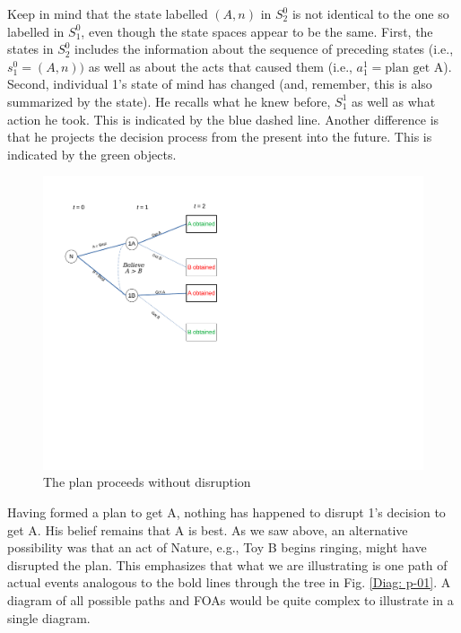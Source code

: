 \documentclass[
11pt,
titlepage,
reqno,
]{article}%
\theoremstyle{definition}
\begin{document}
Keep in mind that the state labelled $(A,n)$ in $S^0_2$ is not identical to the one so labelled in $S^0_1$, even though the state spaces appear to be the same. First, the states in $S^0_2$ includes the information about the sequence of preceding states (i.e., $s^0_1=(A,n))$ as well as about the acts that caused them (i.e., $a^1_1 = \text{plan get A}$). Second,  individual 1's state of mind has changed (and, remember, this is also summarized by the state). He recalls what he knew before, $S^1_1$ as well as what action he took. This  is indicated by the blue dashed line. Another difference is that he projects the decision process from the present into the future. This is indicated by the green objects. 

\begin{figure}[h!]
	\centering
	\includegraphics*[page=7,trim = 0 3.5in 2.5in 0in,scale=.80]{Awareness_Diagrams_All}
	\caption{The plan proceeds without disruption\label{Diag: p-07}}%
\end{figure}

Having formed a plan to get A, nothing has happened to disrupt 1's decision to get A. His belief remains that A is best. As we saw above, an alternative possibility was that an act of Nature, e.g., Toy B begins ringing, might have disrupted the plan. This emphasizes that what we are illustrating is one path of actual events analogous to the bold lines through the tree in Fig. \ref{Diag: p-01}. A diagram of all possible paths and FOAs would be quite complex to illustrate in a single diagram. 
\end{document}
